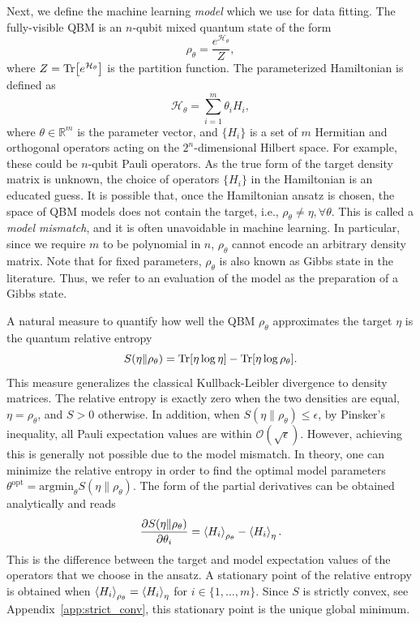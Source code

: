 \documentclass[
    aps,
    prx,
    onecolumn
]{revtex4-2}
\begin{document}
Next, we define the machine learning \emph{model} which we use for data fitting. The fully-visible QBM is an $n$-qubit mixed quantum state of the form 
\begin{equation}
    \rho_\theta = \frac{e^{\mathcal{H}_\theta}}{Z}, 
\end{equation} 
where $Z=\Tr[e^{\mathcal{H}_\theta}]$ is the partition function. The parameterized Hamiltonian is defined as 
\begin{equation}
\label{eq:generic_H}
    \mathcal{H}_\theta = \sum_{i=1}^m \theta_i H_i,
\end{equation} 
where $\theta \in \mathbb{R}^m$ is the parameter vector, and $\{H_i\}$ is a set of $m$ Hermitian and orthogonal operators acting on the $2^n$-dimensional Hilbert space. For example, these could be $n$-qubit Pauli operators. As the true form of the target density matrix is unknown, the choice of operators $\{ H_i \}$ in the Hamiltonian is an educated guess. It is possible that, once the Hamiltonian ansatz is chosen, the space of QBM models does not contain the target, i.e., $\rho_\theta \neq \eta, \forall \theta$. This is called a \emph{model mismatch}, and it is often unavoidable in machine learning. In particular, since we require $m$ to be polynomial in $n$, $\rho_\theta$ cannot encode an arbitrary density matrix. Note that for fixed parameters, $\rho_\theta$ is also known as Gibbs state in the literature. Thus, we refer to an evaluation of the model as the preparation of a Gibbs state.

A natural measure to quantify how well the QBM $\rho_\theta$ approximates the target $\eta$ is the quantum relative entropy
\begin{equation}
\label{eq:RelEnt}
    S(\eta \| \rho_\theta) = \Tr[\eta \log{\eta}] - \Tr[\eta \log{\rho_\theta}]. 
\end{equation} 
This measure generalizes the classical Kullback-Leibler divergence to density matrices.
The relative entropy is exactly zero when the two densities are equal, $\eta=\rho_\theta$, and $S > 0$ otherwise. In addition, when $S(\eta \| \rho_\theta)\leq\epsilon$, by Pinsker's inequality, all Pauli expectation values are within $\mathcal{O}(\sqrt{\epsilon})$. However, achieving this is generally not possible due to the model mismatch. In theory, one can minimize the relative entropy in order to find the optimal model parameters $\theta^{\mathrm{opt}}=\mathrm{argmin}_{\theta}S(\eta \| \rho_\theta)$. The form of the partial derivatives can be obtained analytically and reads
\begin{equation}
\label{eq:RelEntropDeriv}
    \frac{\partial S(\eta\|\rho_\theta)}{\partial \theta_i} = \expval{H_i}_{\rho_\theta} - \expval{H_i}_\eta . 
\end{equation}
This is the difference between the target and model expectation values of the operators that we choose in the ansatz. A stationary point of the relative entropy is obtained when $\expval{H_i}_{\rho_\theta} = \expval{H_i}_\eta$ for $i \in \{1, \dots, m\}$. Since $S$ is strictly convex, see Appendix~\ref{app:strict_conv}, this stationary point is the unique global minimum. 
\end{document}
